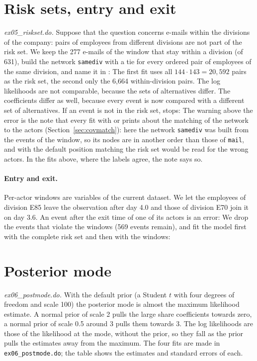 \section{Risk sets, entry and exit}\label{sec:ex-risk}

\emph{ex05\_riskset.do.} Suppose that the question concerns e-mails within the divisions of the company: pairs of employees from different divisions are not part of the risk set. We keep the 277 e-mails of the window that stay within a division (of 631), build the network \texttt{samediv} with a tie for every ordered pair of employees of the same division, and name it in :
The first fit uses all $144\cdot143=20{,}592$ pairs as the risk set, the second only the 6,664 within-division pairs. The log likelihoods are not comparable, because the sets of alternatives differ. The coefficients differ as well, because every event is now compared with a different set of alternatives. If an event is not in the risk set, \nwrem{} stops:
The warning above the error is the note that every fit with  or  prints about the matching of the network to the actors (Section~\ref{sec:covmatch}): here the network \texttt{samediv} was built from the events of the window, so its nodes are in another order than those of \texttt{mail}, and with the default position matching the risk set would be read for the wrong actors. In the fits above, where the labels agree, the note says so.
\paragraph{Entry and exit.} Per-actor windows are variables of the current dataset. We let the employees of division E85 leave the observation after day 4.0 and those of division E70 join it on day 3.6. An event after the exit time of one of its actors is an error:
We drop the events that violate the windows (569 events remain), and fit the model first with the complete risk set and then with the windows:

\section{Posterior mode}\label{sec:ex-post}

\emph{ex06\_postmode.do.} With the default prior (a Student $t$ with four degrees of freedom and scale 100) the posterior mode is almost the maximum likelihood estimate. A normal prior of scale 2 pulls the large share coefficients towards zero, a normal prior of scale 0.5 around 3 pulls them towards 3.
The log likelihoods are those of the likelihood at the mode, without the prior, so they fall as the prior pulls the estimates away from the maximum. The four fits are made in \texttt{ex06\_postmode.do}; the table shows the estimates and standard errors of each.

